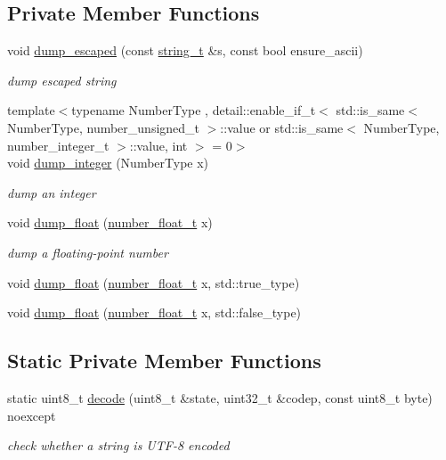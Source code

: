 \subsection*{Private Member Functions}
\begin{DoxyCompactItemize}
\item 
void \hyperlink{classnlohmann_1_1detail_1_1serializer_ac1f8d1165b44149bd8be397dce68ea05}{dump\+\_\+escaped} (const \hyperlink{classnlohmann_1_1detail_1_1serializer_ad08aa54fac1dd0a453320c54137d45ba}{string\+\_\+t} \&s, const bool ensure\+\_\+ascii)
\begin{DoxyCompactList}\small\item\em dump escaped string \end{DoxyCompactList}\item 
{\footnotesize template$<$typename Number\+Type , detail\+::enable\+\_\+if\+\_\+t$<$ std\+::is\+\_\+same$<$ Number\+Type, number\+\_\+unsigned\+\_\+t $>$\+::value or std\+::is\+\_\+same$<$ Number\+Type, number\+\_\+integer\+\_\+t $>$\+::value, int $>$  = 0$>$ }\\void \hyperlink{classnlohmann_1_1detail_1_1serializer_a944f6dea8dbe2961da145d2f62fa2c2f}{dump\+\_\+integer} (Number\+Type x)
\begin{DoxyCompactList}\small\item\em dump an integer \end{DoxyCompactList}\item 
void \hyperlink{classnlohmann_1_1detail_1_1serializer_a6d652a3bfa581cf1cd7790d6d11ea52f}{dump\+\_\+float} (\hyperlink{classnlohmann_1_1detail_1_1serializer_a460c6794fbabbb2ae83380e987a6c030}{number\+\_\+float\+\_\+t} x)
\begin{DoxyCompactList}\small\item\em dump a floating-\/point number \end{DoxyCompactList}\item 
void \hyperlink{classnlohmann_1_1detail_1_1serializer_a24b0fe45dc774441237bde198a133d8a}{dump\+\_\+float} (\hyperlink{classnlohmann_1_1detail_1_1serializer_a460c6794fbabbb2ae83380e987a6c030}{number\+\_\+float\+\_\+t} x, std\+::true\+\_\+type)
\item 
void \hyperlink{classnlohmann_1_1detail_1_1serializer_a331dad892fc00313f928fdaa6bc8f849}{dump\+\_\+float} (\hyperlink{classnlohmann_1_1detail_1_1serializer_a460c6794fbabbb2ae83380e987a6c030}{number\+\_\+float\+\_\+t} x, std\+::false\+\_\+type)
\end{DoxyCompactItemize}
\subsection*{Static Private Member Functions}
\begin{DoxyCompactItemize}
\item 
static uint8\+\_\+t \hyperlink{classnlohmann_1_1detail_1_1serializer_a1cc5cb2f6993cefedad087a6cef0e8fb}{decode} (uint8\+\_\+t \&state, uint32\+\_\+t \&codep, const uint8\+\_\+t byte) noexcept
\begin{DoxyCompactList}\small\item\em check whether a string is U\+T\+F-\/8 encoded \end{DoxyCompactList}\end{DoxyCompactItemize}
